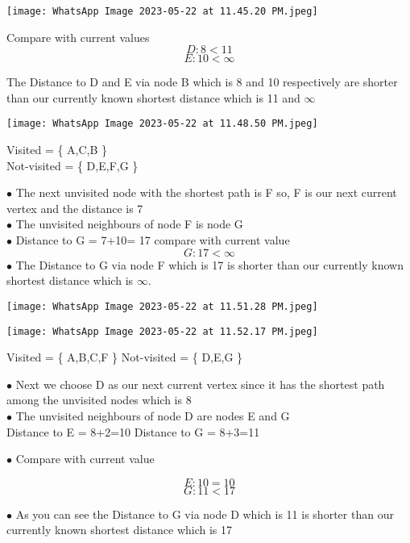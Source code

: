 \documentclass[23pt]{article}
\begin{document}
\begin{center}
\texttt{[image: WhatsApp Image 2023-05-22 at 11.45.20 PM.jpeg]}
\end{center}

Compare with current values 
     $$ D : 8 < 11 $$
     $$ E : 10 < \infty $$

The Distance to D and E via node B which is 8 and 10 respectively are shorter than our currently known shortest distance which is 11 and $\infty$ 

\begin{center}
\texttt{[image: WhatsApp Image 2023-05-22 at 11.48.50 PM.jpeg]}
\end{center}

Visited = \{ A,C,B \} \\
		Not-visited = \{ D,E,F,G \}
 
	$\bullet$ The next unvisited node with the shortest path is F so, F is our next current vertex and the distance is 7 \\
	$\bullet$ The unvisited neighbours of node F is node G \\
	$\bullet$ Distance to G = 7+10= 17 compare with current value 
			$$ G : 17 < \infty $$
	$\bullet$ The Distance to G via node F which is 17 is shorter than our currently known shortest distance which is $\infty$. \\
 
\begin{center}
\texttt{[image: WhatsApp Image 2023-05-22 at 11.51.28 PM.jpeg]}
\end{center}

\begin{center}
\texttt{[image: WhatsApp Image 2023-05-22 at 11.52.17 PM.jpeg]}
\end{center}

Visited = \{ A,B,C,F \}
Not-visited = \{ D,E,G \}

	$\bullet$ Next we choose D as our next current vertex since it has the shortest path among the unvisited nodes which is 8\\
	$\bullet$ The unvisited neighbours of node D are nodes E and G\\

		Distance to E = 8+2=10
		Distance to G = 8+3=11

	$\bullet$ Compare with current value 

		$$ E : 10 = 10 $$
		$$ G : 11 < 17  $$

 	$\bullet$ As you can see the Distance to G via node D which is 11 is shorter than our currently known shortest distance which is 17
\end{document}
